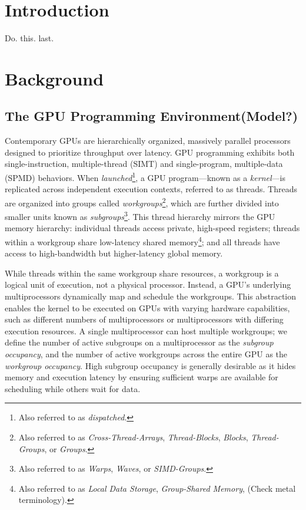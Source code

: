 \documentclass[sigconf]{acmart}
\begin{document}
\section{Introduction}
 Do. this. last.
 
\section{Background}
\subsection{The GPU Programming Environment(Model?)}
 Contemporary GPUs are hierarchically organized, massively parallel processors designed to prioritize throughput over latency. GPU programming exhibits both single-instruction, multiple-thread (SIMT) and single-program, multiple-data (SPMD) behaviors. When \emph{launched}\footnote{Also referred to as \emph{dispatched}.}, a GPU program—known as a \emph{kernel}—is replicated across independent execution contexts, referred to as threads. Threads are organized into groups called \emph{workgroups}\footnote{Also referred to as \emph{Cross-Thread-Arrays}, \emph{Thread-Blocks}, \emph{Blocks}, \emph{Thread-Groups}, or \emph{Groups}.}, which are further divided into smaller units known as \emph{subgroups}\footnote{Also referred to as \emph{Warps}, \emph{Waves}, or \emph{SIMD-Groups}.}. This thread hierarchy mirrors the GPU memory hierarchy: individual threads access private, high-speed registers; threads within a workgroup share low-latency shared memory\footnote{Also referred to as \emph{Local Data Storage}, \emph{Group-Shared Memory}, (Check metal terminology).}; and all threads have access to high-bandwidth but higher-latency global memory.

 While threads within the same workgroup share resources, a workgroup is a logical unit of execution, not a physical processor. Instead, a GPU's underlying multiprocessors dynamically map and schedule the workgroups. This abstraction enables the kernel to be executed on GPUs with varying hardware capabilities, such as different numbers of multiprocessors or multiprocessors with differing execution resources. A single multiprocessor can host multiple workgroups; we define the number of active subgroups on a multiprocessor as the \emph{subgroup occupancy}, and the number of active workgroups across the entire GPU as the \emph{workgroup occupancy}. High subgroup occupancy is generally desirable as it hides memory and execution latency by ensuring sufficient warps are available for scheduling while others wait for data.
 
\end{document}
